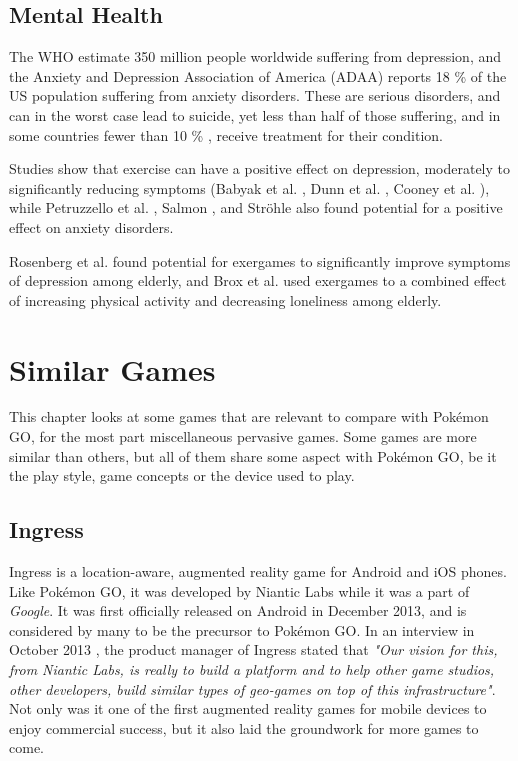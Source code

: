 \section{Mental Health}
\label{sec:lit-study-mental-health}

The WHO \cite{WHOdepression} estimate 350 million people worldwide suffering from depression, and the Anxiety and Depression Association of America (ADAA) \cite{ADAAanxiety} reports 18 \% of the US population suffering from anxiety disorders. These are serious disorders, and can in the worst case lead to suicide, yet less than half of those suffering, and in some countries fewer than 10 \% \cite{WHOdepression}, receive treatment for their condition.

Studies show that exercise can have a positive effect on depression, moderately to significantly reducing symptoms (Babyak et al. \cite{babyak2000exercise}, Dunn et al. \cite{dunn2005exercise}, Cooney et al. \cite{cooney2014exercise}), while Petruzzello et al. \cite{petruzzello1991meta}, Salmon \cite{salmon2001effects}, and Ströhle \cite{strohle2009physical} also found potential for a positive effect on anxiety disorders.

Rosenberg et al. \cite{rosenberg2010exergames} found potential for exergames to significantly improve symptoms of depression among elderly, and Brox et al. \cite{brox2011exergames} used exergames to a combined effect of increasing physical activity and decreasing loneliness among elderly.



\chapter{Similar Games}
\label{chapter:lit-study-similar-games}

This chapter looks at some games that are relevant to compare with Pokémon GO, for the most part miscellaneous pervasive games. Some games are more similar than others, but all of them share some aspect with Pokémon GO, be it the play style, game concepts or the device used to play.

\section{Ingress}

Ingress is a location-aware, augmented reality game for Android and iOS phones. Like Pokémon GO, it was developed by Niantic Labs while it was a part of \emph{Google}. It was first officially released on Android in December 2013, and is considered by many to be the precursor to Pokémon GO. In an interview in October 2013 \cite{gamasutraBadger}, the product manager of Ingress stated that \emph{"Our vision for this, from Niantic Labs, is really to build a platform and to help other game studios, other developers, build similar types of geo-games on top of this infrastructure"}. Not only was it one of the first augmented reality games for mobile devices to enjoy commercial success, but it also laid the groundwork for more games to come.

